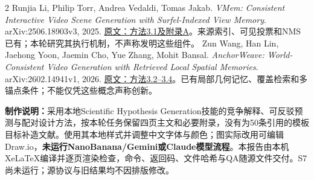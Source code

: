 \documentclass[11pt,a4paper,fontset=none]{ctexart}
\newcommand{\smallhead}[1]{\vspace{4pt}{\large\bfseries\color{hypothesis1}#1}\par}
\begin{document}
\smallhead{两项直接相关的已核验原始文献}
\vspace{-3mm}
\begingroup\small
\renewcommand{\section}[2]{}%
\begin{thebibliography}{2}
 Runjia Li, Philip Torr, Andrea Vedaldi, Tomas Jakab. \textit{VMem: Consistent Interactive Video Scene Generation with Surfel-Indexed View Memory}. arXiv:2506.18903v3, 2025. \href{https://arxiv.org/html/2506.18903v3}{原文：方法3.1及附录A}。来源索引、可见投票和NMS已有；本轮研究其执行机制，不声称发明这些组件。
 Zun Wang, Han Lin, Jaehong Yoon, Jaemin Cho, Yue Zhang, Mohit Bansal. \textit{AnchorWeave: World-Consistent Video Generation with Retrieved Local Spatial Memories}. arXiv:2602.14941v1, 2026. \href{https://arxiv.org/html/2602.14941v1}{原文：方法3.2--3.4}。已有局部几何记忆、覆盖检索和多锚点条件；不能仅凭这些概念声称创新。
\end{thebibliography}
\endgroup

{\small\textbf{制作说明：}采用本地Scientific Hypothesis Generation技能的竞争解释、可反驳预测与配对设计方法，按本轮任务保留四页主文和必要附录，没有为50条引用的模板目标补造文献。使用其本地样式并调整中文字体与颜色；图实际改用可编辑Draw.io，\textbf{未运行NanoBanana/Gemini或Claude模型流程}。本报告由本机XeLaTeX编译并逐页渲染检查，命令、返回码、文件哈希与QA随源文件交付。S7尚未运行；源协议与旧结果均不因排版修改。}
\end{document}
